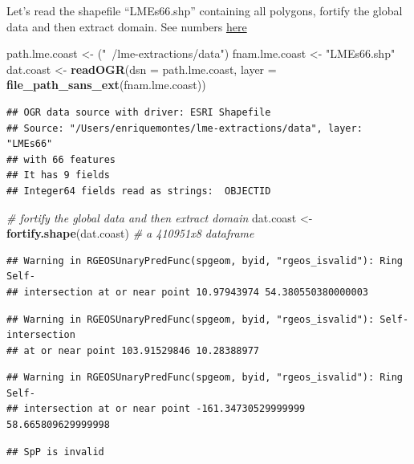\documentclass[12pt,]{article}
\newenvironment{Shaded}{\begin{snugshade}}{\end{snugshade}}
\newcommand{\CommentTok}[1]{\textcolor[rgb]{0.56,0.35,0.01}{\textit{#1}}}
\newcommand{\DataTypeTok}[1]{\textcolor[rgb]{0.13,0.29,0.53}{#1}}
\newcommand{\KeywordTok}[1]{\textcolor[rgb]{0.13,0.29,0.53}{\textbf{#1}}}
\newcommand{\NormalTok}[1]{#1}
\newcommand{\StringTok}[1]{\textcolor[rgb]{0.31,0.60,0.02}{#1}}
\begin{document}
Let's read the shapefile ``LMEs66.shp'' containing all polygons, fortify
the global data and then extract domain. See numbers
\href{http://lme.edc.uri.edu/index.php/lme-introduction}{here}

\begin{Shaded}
\begin{Highlighting}[]
\NormalTok{path.lme.coast <-}\StringTok{ }\NormalTok{(}\StringTok{"~/lme-extractions/data"}\NormalTok{)}
\NormalTok{fnam.lme.coast <-}\StringTok{ "LMEs66.shp"}
\NormalTok{dat.coast <-}\StringTok{ }\KeywordTok{readOGR}\NormalTok{(}\DataTypeTok{dsn =}\NormalTok{ path.lme.coast, }
                     \DataTypeTok{layer =} \KeywordTok{file_path_sans_ext}\NormalTok{(fnam.lme.coast))}
\end{Highlighting}
\end{Shaded}

\begin{verbatim}
## OGR data source with driver: ESRI Shapefile 
## Source: "/Users/enriquemontes/lme-extractions/data", layer: "LMEs66"
## with 66 features
## It has 9 fields
## Integer64 fields read as strings:  OBJECTID
\end{verbatim}

\begin{Shaded}
\begin{Highlighting}[]
\CommentTok{# fortify the global data and then extract domain}
\NormalTok{dat.coast <-}\StringTok{ }\KeywordTok{fortify.shape}\NormalTok{(dat.coast) }\CommentTok{# a 410951x8 dataframe}
\end{Highlighting}
\end{Shaded}

\begin{verbatim}
## Warning in RGEOSUnaryPredFunc(spgeom, byid, "rgeos_isvalid"): Ring Self-
## intersection at or near point 10.97943974 54.380550380000003
\end{verbatim}

\begin{verbatim}
## Warning in RGEOSUnaryPredFunc(spgeom, byid, "rgeos_isvalid"): Self-intersection
## at or near point 103.91529846 10.28388977
\end{verbatim}

\begin{verbatim}
## Warning in RGEOSUnaryPredFunc(spgeom, byid, "rgeos_isvalid"): Ring Self-
## intersection at or near point -161.34730529999999 58.665809629999998
\end{verbatim}

\begin{verbatim}
## SpP is invalid
\end{verbatim}
\end{document}
